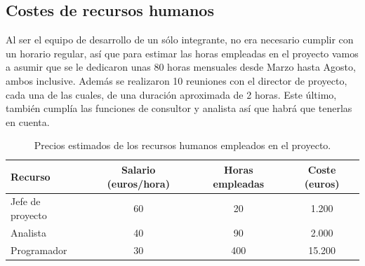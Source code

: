 \subsection{Costes de recursos humanos}
Al ser el equipo de desarrollo de un sólo integrante, no era necesario cumplir con un horario regular, así que para estimar las horas empleadas en el proyecto vamos a asumir que se le dedicaron unas 80 horas mensuales desde Marzo hasta Agosto, ambos inclusive. Además se realizaron 10 reuniones con el director de proyecto, cada una de las cuales, de una duración aproximada de 2 horas. Este último, también cumplía las funciones de consultor y analista así que habrá que tenerlas en cuenta.
\begin{table}[bt]
\begin{center}
\small
\begin{tabular}{|l|c|c|c|}
\hline 
Recurso & Salario (euros/hora) & Horas empleadas & Coste (euros) \\
\hline \hline
Jefe de proyecto & 60 & 20 & 1.200 \\ \hline
Analista & 40 & 90 & 2.000 \\ \hline
Programador & 30 & 400 & 15.200 \\ \hline
\end{tabular}
\caption{Precios estimados de los recursos humanos empleados en el proyecto.}
\label{precios:rrhh}
\end{center}
\end{table}






